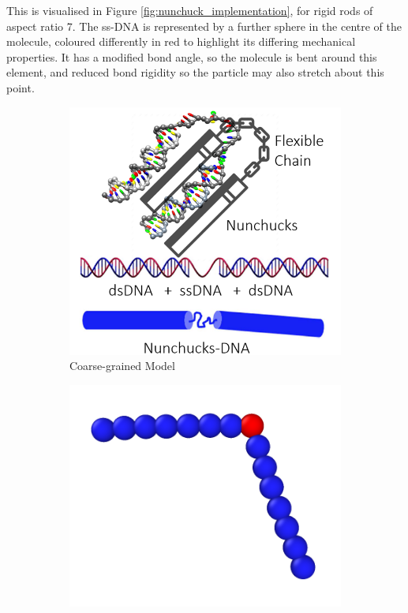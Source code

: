 \documentclass[11pt, a4paper]{article} %
\begin{document}
This is visualised in Figure \ref{fig:nunchuck_implementation}, for rigid rods of aspect ratio 7. The ss-DNA is represented by a further sphere in the centre of the molecule, coloured differently in red to highlight its differing mechanical properties. It has a modified bond angle, so the molecule is bent around this element, and reduced bond rigidity so the particle may also stretch about this point. 

\begin{figure}[ht]
	\hfill  %
	\begin{subfigure}{.4\textwidth}
		\centering
		\includegraphics[width=\linewidth]{Figures/nunchucks_artist}  
		\caption{Coarse-grained Model}
		\label{fig:nunchuck_analogy}
	\end{subfigure}
	\hfill %
	\begin{subfigure}{.4\textwidth}
		\centering
		\includegraphics[width=\linewidth]{Figures/nunchuck_profile_coloured}  

\end{subfigure}
\end{figure}
\end{document}
